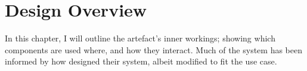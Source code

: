 \documentclass[../main.tex]{subfiles}
\begin{document}
\section{Design Overview}
In this chapter, I will outline the artefact's inner workings; showing which components are used where, and how they interact. 
Much of the system has been informed by how \cite{pharrPhysicallyBasedRendering2016} designed their system, albeit modified to fit the use case.
\end{document}
